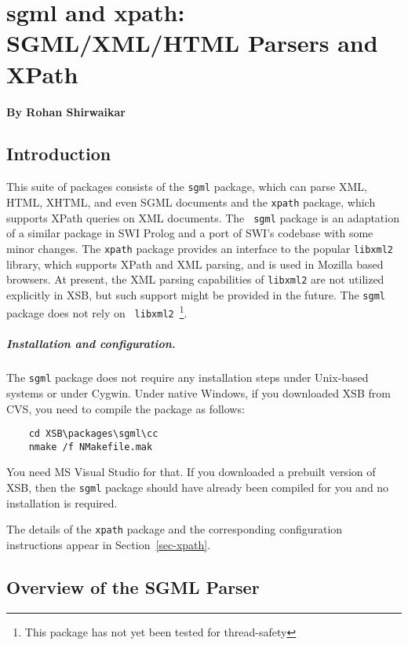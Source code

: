 
\chapter{sgml and xpath: SGML/XML/HTML Parsers and XPath}

  \begin{center}
    {\Large {\bf By Rohan Shirwaikar}}
  \end{center}



\section{Introduction}
This suite of packages consists of the {\tt sgml} package, which can
parse XML, HTML, XHTML, and even SGML documents and the {\tt xpath}
package, which supports XPath queries on XML documents.  The {\tt
  sgml} package is an adaptation of a similar package in SWI Prolog
and a port of SWI's codebase with some minor changes. The {\tt xpath}
package provides an interface to the popular {\tt libxml2} library,
which supports XPath and XML parsing, and is used in Mozilla based
browsers. At present, the XML parsing capabilities of {\tt libxml2}
are not utilized explicitly in XSB, but such support might be provided
in the future. The {\tt sgml} package does not rely on {\tt
  libxml2}~\footnote{This package has not yet been tested for
  thread-safety}.

\paragraph{Installation and configuration.}
The {\tt sgml} package does not require any installation steps under
Unix-based systems or under Cygwin. Under native Windows, if you downloaded XSB
from CVS, you need to compile the package as follows:
\begin{verbatim}
    cd XSB\packages\sgml\cc
    nmake /f NMakefile.mak
\end{verbatim}
You need MS Visual Studio for that. If you downloaded a prebuilt version
of XSB, then the {\tt sgml}  package should have already been compiled for you
and no installation is required.

The details of the {\tt xpath} package and the corresponding configuration
instructions appear in Section~\ref{sec-xpath}.

\section{Overview of the SGML Parser}

